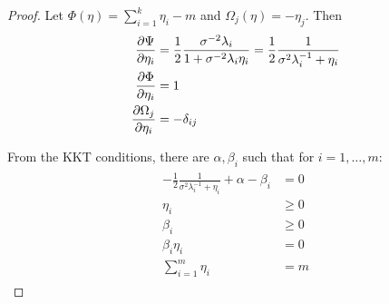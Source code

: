 \begin{proof}



  Let $\Phi(\eta) = \sum_{i=1}^k \eta_i - m$ and $\Omega_j(\eta) =
   -\eta_j$. Then
  \begin{align*}
    \begin{split}
      \frac{\partial \tar}{\partial \eta_i}  &=
       \frac12 \frac{\sigma^{-2}\lambda_i}{1 + \sigma^{-2} \lambda_i\eta_i} = \frac12 \frac{1}{\sigma^{2}\lambda_i^{-1} + \eta_i} \\
      \frac{\partial\Phi}{\partial \eta_i} &= 1 \\
      \frac{\partial \Omega_j}{\partial \eta_i} &= -\delta_{ij}      
    \end{split}
  \end{align*}

  From the KKT conditions, there are $\alpha, \beta_i$ such that for $i=1,\dots,m$:
  \begin{align}
    \begin{split}
      -\frac12 \frac{1}{\sigma^{2}\lambda_i^{-1} + \eta_i} + \alpha - \beta_i  &= 0 \\
      \eta_i &\geq 0\\
      \beta_i &\geq 0\\
      \beta_i \eta_i &= 0\\
      \sum_{i=1}^m \eta_i &= m 
    \end{split}
  \end{align}


\end{proof}
